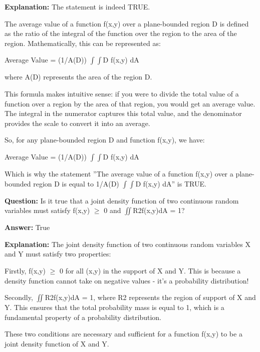 \documentclass{article}
\begin{document}
                \textbf{Explanation:} The statement is indeed TRUE.

The average value of a function f(x,y) over a plane-bounded region D is defined as the ratio of the integral of the function over the region to the area of the region. Mathematically, this can be represented as:

Average Value = (1/A(D)) \ensuremath{\int}\ensuremath{\int}D f(x,y) dA

where A(D) represents the area of the region D.

This formula makes intuitive sense: if you were to divide the total value of a function over a region by the area of that region, you would get an average value. The integral in the numerator captures this total value, and the denominator provides the scale to convert it into an average.

So, for any plane-bounded region D and function f(x,y), we have:

Average Value = (1/A(D)) \ensuremath{\int}\ensuremath{\int}D f(x,y) dA

Which is why the statement ''The average value of a function f(x,y) over a plane-bounded region D is equal to 1/A(D) \ensuremath{\int}\ensuremath{\int}D f(x,y) dA'' is TRUE.
                
                \vspace{0.5cm} 
        
            
                \textbf {Question:} Is it true that a joint density function of two continuous random variables must satisfy f(x,y) \ensuremath{\geq} 0 and \ensuremath{\iint}R2f(x,y)dA = 1?
                
                \textbf{Answer:} True

                \textbf{Explanation:} The joint density function of two continuous random variables X and Y must satisfy two properties:

Firstly, f(x,y) \ensuremath{\geq} 0 for all (x,y) in the support of X and Y. This is because a density function cannot take on negative values - it's a probability distribution!

Secondly, \ensuremath{\iint}R2f(x,y)dA = 1, where R2 represents the region of support of X and Y. This ensures that the total probability mass is equal to 1, which is a fundamental property of a probability distribution.

These two conditions are necessary and sufficient for a function f(x,y) to be a joint density function of X and Y.
                
\end{document}
